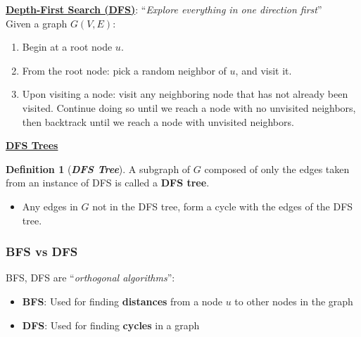 \documentclass[12pt]{extarticle}
\theoremstyle{definition}
\newtheorem*{definition}{Definition}
\theoremstyle{remark}
\newcommand{\probname}[1]{\noindent \textbf{\textit{#1}}}
\newcommand{\probtitle}[1]{\noindent \textbf{\ul{#1}}}
\begin{document}
\begin{tcolorbox}[colback=blue!8!white]
\textbf{\ul{Depth-First Search (DFS)}}: “\textit{Explore everything in one direction first}”
\\[-9pt]

Given a graph $G(V,E)$:
\begin{enumerate}
    \item Begin at a root node $u$.
    \item From the root node: pick a random neighbor of $u$, and visit it.
    \item Upon visiting a node: visit any neighboring node that has not already been visited. Continue doing so until we reach a node with no unvisited neighbors, then backtrack until we reach a node with unvisited neighbors.
\end{enumerate}

\begin{center}
\end{center}

\probtitle{DFS Trees}
\begin{definition}[\probname{DFS Tree}]
    A subgraph of $G$ composed of only the edges taken from an instance of DFS is called a \textbf{DFS tree}.\begin{itemize}
        \item Any edges in $G$ not in the DFS tree, form a cycle with the edges of the DFS tree.
    \end{itemize}
\end{definition}
\end{tcolorbox}

\subsubsection*{BFS vs DFS}
BFS, DFS are ``\textit{orthogonal algorithms}'': \begin{itemize}
    \item \textbf{BFS}: Used for finding \textbf{distances} from a node $u$ to other nodes in the graph
    \item \textbf{DFS}: Used for finding \textbf{cycles} in a graph
\end{itemize}
\end{document}
